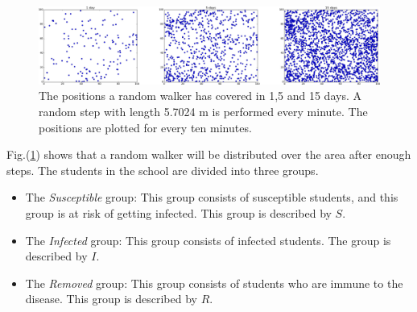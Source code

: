 \documentclass[%
twoside,                 %
final,                   %
chapterprefix=true,      %
open=right               %
10pt]{book}
\begin{document}
\begin{figure}[ht]
  \centerline{\includegraphics[width=0.8\linewidth]{3_fig/random_walk_days.png}}
  \caption{
  \label{fig:random_walker_days} The positions a random walker has covered in 1,5 and 15 days. A random step with length 5.7024 m is performed every minute. The positions are plotted for every ten minutes.
  }
\end{figure}


Fig.(\ref{fig:random_walker_days}) shows that a random walker will be distributed over the area after enough steps. The students in the school are divided into three groups. 
\begin{itemize}
\item The \emph{Susceptible} group: This group consists of susceptible students, and this group is at risk of getting infected. This group is described by $S$. 

\item The \emph{Infected} group: This group consists of infected students. The group is described by $I$. 

\item The \emph{Removed} group: This group consists of students who are immune to the disease. This group is described by $R$. 
\end{itemize}
\end{document}
